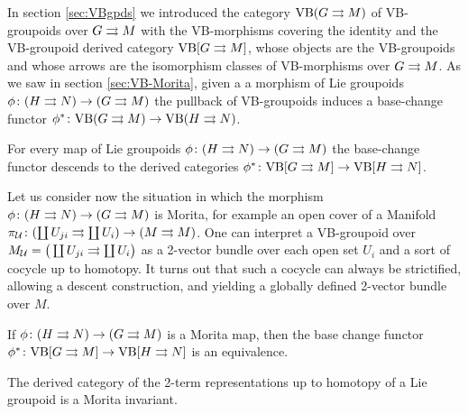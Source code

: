 %
%

In section \ref{sec:VBgpds} we introduced the category $\mathrm{VB}(G\rightrightarrows M)$ of VB-groupoids over $G\rightrightarrows M$ with the VB-morphisms covering the identity and the VB-groupoid derived category $\mathrm{VB}[G\rightrightarrows M]$, whose objects are the VB-groupoids and whose arrows are the isomorphism classes of VB-morphisms over $G\rightrightarrows M$.
As we saw in section \ref{sec:VB-Morita}, given a a morphism of Lie groupoids $\phi\colon(H\rightrightarrows N)\to (G\rightrightarrows M)$ the pullback of VB-groupoids induces a base-change functor $\phi^*\colon \mathrm{VB}(G\rightrightarrows M)\to \mathrm{VB}(H\rightrightarrows N)$.

\begin{lemma}
For every map of Lie groupoids $\phi\colon(H\rightrightarrows N)\to(G\rightrightarrows M)$ the base-change functor descends to the derived categories $\phi^*\colon \mathrm{VB}[G\rightrightarrows M]\to \mathrm{VB}[H\rightrightarrows N]$.
\end{lemma}

Let us consider now the situation in which the morphism $\phi\colon(H\rightrightarrows N)\to(G\rightrightarrows M)$ is  Morita, for example an open cover of a Manifold $\pi_{\mathcal{U}}\colon (\coprod U_{ji}\rightrightarrows\coprod U_i)\to (M\rightrightarrows M)$.
One can interpret a VB-groupoid over \( M_{\mathcal{U}} = \big( \coprod U_{ji}\rightrightarrows \coprod U_i \big) \) as a 2-vector bundle over each open set $U_i$ and a sort of cocycle up to homotopy.
It turns out that such a cocycle can always be strictified, allowing a descent construction, and yielding a globally defined 2-vector bundle over $M$.

\begin{thm}\label{thm:VB-stacks}
If $\phi\colon(H\rightrightarrows N)\to(G\rightrightarrows M)$ is a Morita map, then the base change functor $\phi^*\colon \mathrm{VB}[G\rightrightarrows M]\to \mathrm{VB}[H\rightrightarrows N]$ is an equivalence.
\end{thm}

\begin{coro}
The derived category of the 2-term representations up to homotopy of a Lie groupoid is a Morita invariant.
\end{coro}
